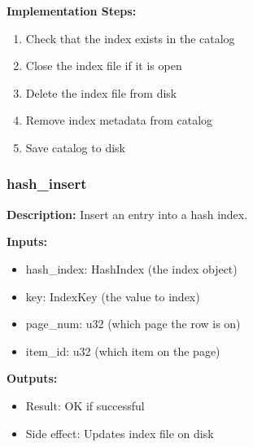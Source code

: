 \documentclass[11pt,a4paper]{article}
\begin{document}
\textbf{Implementation Steps:}
\begin{enumerate}
\item Check that the index exists in the catalog
\item Close the index file if it is open
\item Delete the index file from disk
\item Remove index metadata from catalog
\item Save catalog to disk
\end{enumerate}

\subsubsection{hash\_insert}

\textbf{Description:} Insert an entry into a hash index.

\textbf{Inputs:}
\begin{itemize}
\item hash\_index: HashIndex (the index object)
\item key: IndexKey (the value to index)
\item page\_num: u32 (which page the row is on)
\item item\_id: u32 (which item on the page)
\end{itemize}

\textbf{Outputs:}
\begin{itemize}
\item Result: OK if successful
\item Side effect: Updates index file on disk
\end{itemize}
\end{document}
